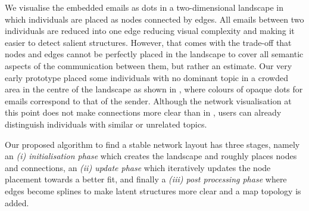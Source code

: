We visualise the embedded emails as dots in a two-dimensional landscape in which individuals are placed as nodes connected by edges.
All emails between two individuals are reduced into one edge reducing visual complexity and making it easier to detect salient structures.
However, that comes with the trade-off that nodes and edges cannot be perfectly placed in the landscape to cover all semantic aspects of the communication between them, but rather an estimate.
Our very early prototype placed some individuals with no dominant topic in a crowded area in the centre of the landscape as shown in , where colours of opaque dots for emails correspond to that of the sender.
Although the network visualisation at this point does not make connections more clear than in , users can already distinguish individuals with similar or unrelated topics.

Our proposed algorithm to find a stable network layout has three stages, namely an \textit{(i) initialisation phase} which creates the landscape and roughly places nodes and connections, an \textit{(ii) update phase} which iteratively updates the node placement towards a better fit, and finally a \textit{(iii) post processing phase} where edges become splines to make latent structures more clear and a map topology is added.






